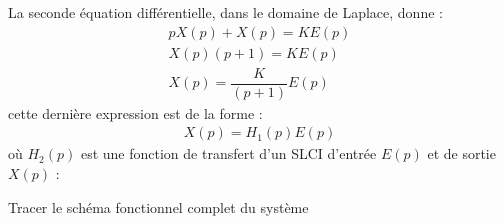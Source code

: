 La seconde équation différentielle, dans le domaine de Laplace, donne : 
\begin{align*}
    pX(p)+X(p)=KE(p) \\
    X(p) (p+1) = KE(p) \\
    X(p) = \dfrac{K}{(p+1)} E(p) 
\end{align*}
cette dernière expression est de la forme :
\begin{align}
X(p) = H_1(p) E(p)
\label{eq-h1}
\end{align}
où $H_2(p)$ est une fonction de transfert d'un SLCI d'entrée $E(p)$ 
et de sortie $X(p)$ :
\begin{center}
\end{center}
\question{}
Tracer le schéma fonctionnel complet du système
\begin{center}
\end{center}

